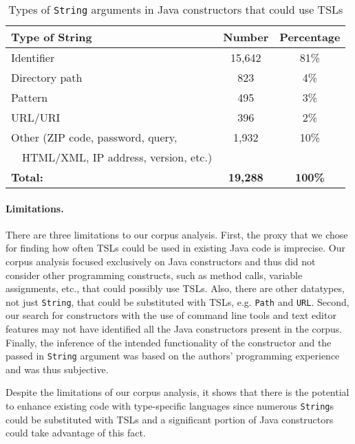 \begin{table}
   \centering
    \begin{tabular}[t]{l | c | c}
    \bf Type of String & \bf Number & \bf Percentage \\ \hline
    Identifier & 15,642 & 81\% \\
    Directory path& 823 & 4\% \\
    Pattern & 495 & 3\% \\
    URL/URI & 396 & 2\% \\
    Other (ZIP code, password, query, & 1,932 & 10\% \\
    ~~HTML/XML, IP address, version, etc.)  & & \\ \hline
    \bf Total: & \bf 19,288 & \bf 100\%
    \end{tabular}
    \vspace{0.15in}
    \caption{Types of \lstinline{String} arguments in Java constructors that could use TSLs}
    \label{strings-in-constructors}
\end{table}

\paragraph{Limitations.} There are three limitations to our corpus analysis. First, the proxy that we chose for finding how often TSLs could be used in existing Java code is imprecise. Our corpus analysis focused exclusively on Java constructors and thus did not consider other programming constructs, such as method calls, variable assignments, etc., that could possibly use TSLs. Also, there are other datatypes, not just \lstinline{String}, that could be substituted with TSLs, e.g. \lstinline{Path} and \lstinline{URL}. Second, our search for constructors with the use of command line tools and text editor features may not have identified all the Java constructors present in the corpus. Finally, the inference of the intended functionality of the constructor and the passed in \lstinline{String} argument was based on the authors' programming experience and was thus subjective.

\vspace{10px}

Despite the limitations of our corpus analysis, it shows that there is the potential to enhance existing code with type-specific languages since numerous \lstinline{String}s could be substituted with TSLs and a significant portion of Java constructors could take advantage of this fact.

